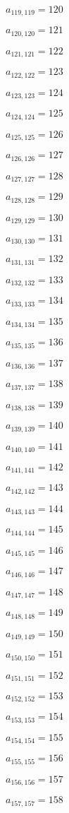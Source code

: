 \documentclass[a4paper,12pt]{article}
\begin{document}
$a _{ 119, 119 } = 120$

$a _{ 120, 120 } = 121$

$a _{ 121, 121 } = 122$

$a _{ 122, 122 } = 123$

$a _{ 123, 123 } = 124$

$a _{ 124, 124 } = 125$

$a _{ 125, 125 } = 126$

$a _{ 126, 126 } = 127$

$a _{ 127, 127 } = 128$

$a _{ 128, 128 } = 129$

$a _{ 129, 129 } = 130$

$a _{ 130, 130 } = 131$

$a _{ 131, 131 } = 132$

$a _{ 132, 132 } = 133$

$a _{ 133, 133 } = 134$

$a _{ 134, 134 } = 135$

$a _{ 135, 135 } = 136$

$a _{ 136, 136 } = 137$

$a _{ 137, 137 } = 138$

$a _{ 138, 138 } = 139$

$a _{ 139, 139 } = 140$

$a _{ 140, 140 } = 141$

$a _{ 141, 141 } = 142$

$a _{ 142, 142 } = 143$

$a _{ 143, 143 } = 144$

$a _{ 144, 144 } = 145$

$a _{ 145, 145 } = 146$

$a _{ 146, 146 } = 147$

$a _{ 147, 147 } = 148$

$a _{ 148, 148 } = 149$

$a _{ 149, 149 } = 150$

$a _{ 150, 150 } = 151$

$a _{ 151, 151 } = 152$

$a _{ 152, 152 } = 153$

$a _{ 153, 153 } = 154$

$a _{ 154, 154 } = 155$

$a _{ 155, 155 } = 156$

$a _{ 156, 156 } = 157$

$a _{ 157, 157 } = 158$
\end{document}
